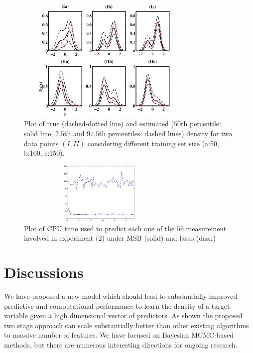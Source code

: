 \documentclass{article}
\begin{document}
\begin{figure}
\centering
\includegraphics[width=85mm,height=60mm]{densityestimate.eps}
\caption{Plot of true (dashed-dotted line) and estimated ($50$th percentile: solid line, $2.5$th and $97.5$th percentiles: dashed lines) density for two data points $(I, II)$ considering different training set size (a:50, b:100, c:150). } \label{plotDensity}
\end{figure}

\begin{figure}
\centering
\includegraphics[width=80mm,height=30mm]{Time_real.eps}
\caption{Plot of CPU time used to predict each one of the $56$ measurement involved in experiment (2) under MSB (solid) and lasso (dash)} \label{fig:real}
\end{figure}


\section*{Discussions}
We have proposed a new model which should lead to substantially improved predictive and computational performance to learn the density of a target variable given a high dimensional vector of predictors. As shown the proposed two stage approach can scale substantially better than other existing algorithms to massive number of features. We have focused on Bayesian MCMC-based methods, but there are numerous interesting directions for ongoing research.





\end{document}

